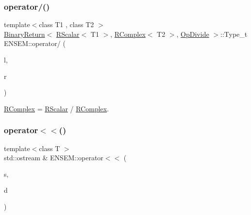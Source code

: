 \subsubsection{\texorpdfstring{operator/()}{operator/()}\hspace{0.1cm}{\footnotesize\ttfamily [3/3]}}
{\footnotesize\ttfamily template$<$class T1 , class T2 $>$ \\
\mbox{\hyperlink{structENSEM_1_1BinaryReturn}{Binary\+Return}}$<$ \mbox{\hyperlink{classENSEM_1_1RScalar}{R\+Scalar}}$<$ T1 $>$, \mbox{\hyperlink{classENSEM_1_1RComplex}{R\+Complex}}$<$ T2 $>$, \mbox{\hyperlink{structENSEM_1_1OpDivide}{Op\+Divide}} $>$\+::Type\+\_\+t E\+N\+S\+E\+M\+::operator/ (\begin{DoxyParamCaption}\item[{const \mbox{\hyperlink{classENSEM_1_1RScalar}{R\+Scalar}}$<$ T1 $>$ \&}]{l,  }\item[{const \mbox{\hyperlink{classENSEM_1_1RComplex}{R\+Complex}}$<$ T2 $>$ \&}]{r }\end{DoxyParamCaption})\hspace{0.3cm}{\ttfamily [inline]}}



\mbox{\hyperlink{classENSEM_1_1RComplex}{R\+Complex}} = \mbox{\hyperlink{classENSEM_1_1RScalar}{R\+Scalar}} / \mbox{\hyperlink{classENSEM_1_1RComplex}{R\+Complex}}. 

\mbox{\label{group__rcomplex_ga3e9d2c0a2fe66eca65cad22143bae236}} 
\subsubsection{\texorpdfstring{operator$<$$<$()}{operator<<()}\hspace{0.1cm}{\footnotesize\ttfamily [1/3]}}
{\footnotesize\ttfamily template$<$class T $>$ \\
std\+::ostream \& E\+N\+S\+E\+M\+::operator$<$$<$ (\begin{DoxyParamCaption}\item[{std\+::ostream \&}]{s,  }\item[{const \mbox{\hyperlink{classENSEM_1_1RComplex}{R\+Complex}}$<$ T $>$ \&}]{d }\end{DoxyParamCaption})\hspace{0.3cm}{\ttfamily [inline]}}




